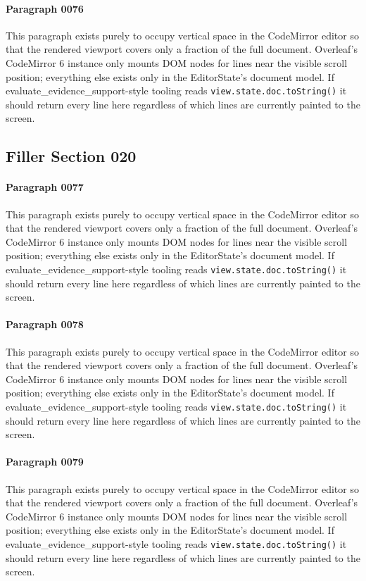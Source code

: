 \documentclass{article}
\begin{document}
\paragraph{Paragraph 0076}
This paragraph exists purely to occupy vertical space in the CodeMirror editor so that the rendered viewport covers only a fraction of the full document. Overleaf's CodeMirror 6 instance only mounts DOM nodes for lines near the visible scroll position; everything else exists only in the EditorState's document model. If evaluate\_evidence\_support-style tooling reads \texttt{view.state.doc.toString()} it should return every line here regardless of which lines are currently painted to the screen.

\subsection{Filler Section 020}
\paragraph{Paragraph 0077}
This paragraph exists purely to occupy vertical space in the CodeMirror editor so that the rendered viewport covers only a fraction of the full document. Overleaf's CodeMirror 6 instance only mounts DOM nodes for lines near the visible scroll position; everything else exists only in the EditorState's document model. If evaluate\_evidence\_support-style tooling reads \texttt{view.state.doc.toString()} it should return every line here regardless of which lines are currently painted to the screen.

\paragraph{Paragraph 0078}
This paragraph exists purely to occupy vertical space in the CodeMirror editor so that the rendered viewport covers only a fraction of the full document. Overleaf's CodeMirror 6 instance only mounts DOM nodes for lines near the visible scroll position; everything else exists only in the EditorState's document model. If evaluate\_evidence\_support-style tooling reads \texttt{view.state.doc.toString()} it should return every line here regardless of which lines are currently painted to the screen.

\paragraph{Paragraph 0079}
This paragraph exists purely to occupy vertical space in the CodeMirror editor so that the rendered viewport covers only a fraction of the full document. Overleaf's CodeMirror 6 instance only mounts DOM nodes for lines near the visible scroll position; everything else exists only in the EditorState's document model. If evaluate\_evidence\_support-style tooling reads \texttt{view.state.doc.toString()} it should return every line here regardless of which lines are currently painted to the screen.
\end{document}
